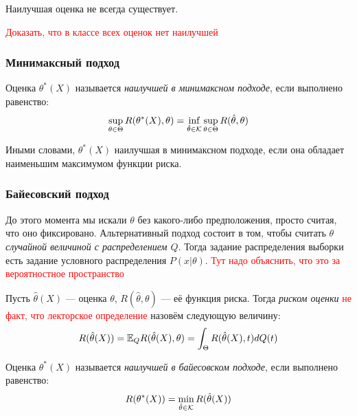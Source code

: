 \begin{note}
	Наилучшая оценка не всегда существует.
\end{note}

\textcolor{red}{Доказать, что в классе всех оценок нет наилучшей}

\subsubsection{Минимаксный подход}

\begin{definition}
	Оценка $\theta^*(X)$ называется \textit{наилучшей в минимаксном подходе}, если выполнено равенство:
	\[
		\sup_{\theta \in \Theta} R(\theta^*(X), \theta) = \inf_{\hat{\theta} \in \mathcal{K}} \sup_{\theta \in \Theta} R(\hat{\theta}, \theta)
	\]
\end{definition}

\begin{note}
	Иными словами, $\theta^*(X)$ наилучшая в минимаксном подходе, если она обладает наименьшим максимумом функции риска.
\end{note}

\subsubsection{Байесовский подход}

\begin{note}
	До этого момента мы искали $\theta$ без какого-либо предположения, просто считая, что оно фиксировано. Альтернативный подход состоит в том, чтобы считать $\theta$ \textit{случайной величиной с распределением $Q$}. Тогда задание распределения выборки есть задание условного распределения $P(x|\theta)$. \textcolor{red}{Тут надо объяснить, что это за вероятностное пространство}
\end{note}

\begin{definition}
	Пусть $\hat{\theta}(X)$ --- оценка $\theta$, $R(\hat{\theta}, \theta)$ --- её функция риска. Тогда \textit{риском оценки} \textcolor{red}{не факт, что лекторское определение} назовём следующую величину:
	\[
		R(\hat{\theta}(X)) = \mathbb{E}_Q R(\hat{\theta}(X), \theta) = \int_\Theta R(\hat{\theta}(X), t) dQ(t)
	\]
\end{definition}

\begin{definition}
	Оценка $\theta^*(X)$ называется \textit{наилучшей в байесовском подходе}, если выполнено равенство:
	\[
		R(\theta^*(X)) = \min_{\hat{\theta} \in \mathcal{K}} R(\hat{\theta}(X))
	\]
\end{definition}

